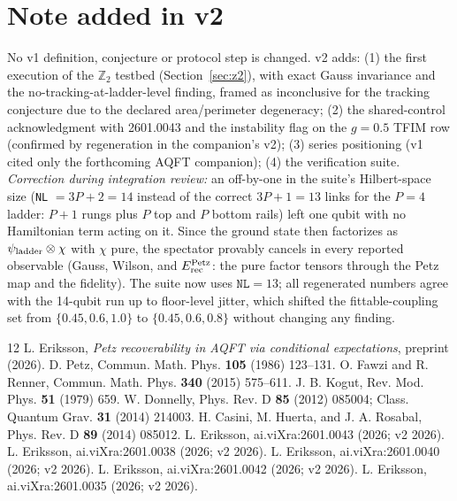 \documentclass[11pt]{article}
\theoremstyle{remark}
\newcommand{\Erec}{E^{\rm Petz}_{\rm rec}}
\begin{document}
\section*{Note added in v2}
No v1 definition, conjecture or protocol step is changed. v2 adds:
(1) the first execution of the $\mathbb{Z}_2$ testbed
(Section~\ref{sec:z2}), with exact Gauss invariance and the
no-tracking-at-ladder-level finding, framed as inconclusive for the
tracking conjecture due to the declared area/perimeter degeneracy;
(2) the shared-control acknowledgment with 2601.0043 and the instability
flag on the $g = 0.5$ TFIM row (confirmed by regeneration in the
companion's v2); (3) series positioning (v1 cited only the forthcoming
AQFT companion); (4) the verification suite. \emph{Correction during
integration review:} an off-by-one in the suite's Hilbert-space size
(\texttt{NL} $= 3P{+}2 = 14$ instead of the correct $3P{+}1 = 13$ links
for the $P = 4$ ladder: $P{+}1$ rungs plus $P$ top and $P$ bottom rails)
left one qubit with no Hamiltonian term acting on it. Since the ground
state then factorizes as $\psi_{\rm ladder} \otimes \chi$ with $\chi$
pure, the spectator provably cancels in every reported observable
(Gauss, Wilson, and $\Erec$: the pure factor tensors through the Petz
map and the fidelity). The suite now uses $\texttt{NL} = 13$; all
regenerated numbers agree with the 14-qubit run up to floor-level
jitter, which shifted the fittable-coupling set from
$\{0.45, 0.6, 1.0\}$ to $\{0.45, 0.6, 0.8\}$ without changing any
finding.

\begin{thebibliography}{12}
 L. Eriksson, \emph{Petz recoverability in AQFT via
conditional expectations}, preprint (2026).
 D. Petz, Commun. Math. Phys. \textbf{105} (1986)
123--131.
 O. Fawzi and R. Renner, Commun. Math. Phys. \textbf{340}
(2015) 575--611.
 J. B. Kogut, Rev. Mod. Phys. \textbf{51} (1979) 659.
 W. Donnelly, Phys. Rev. D \textbf{85} (2012) 085004;
Class. Quantum Grav. \textbf{31} (2014) 214003.
 H. Casini, M. Huerta, and J. A. Rosabal, Phys. Rev. D
\textbf{89} (2014) 085012.
 L. Eriksson, ai.viXra:2601.0043 (2026; v2 2026).
 L. Eriksson, ai.viXra:2601.0038 (2026; v2 2026).
 L. Eriksson, ai.viXra:2601.0040 (2026; v2 2026).
 L. Eriksson, ai.viXra:2601.0042 (2026; v2 2026).
 L. Eriksson, ai.viXra:2601.0035 (2026; v2 2026).
\end{thebibliography}
\end{document}

